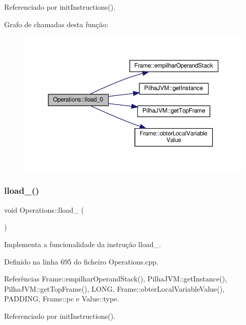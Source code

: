 Referenciado por init\+Instructions().

Grafo de chamadas desta função\+:\nopagebreak
\begin{figure}[H]
\begin{center}
\leavevmode
\includegraphics[width=350pt]{classOperations_a556b64c0764f7a654a30540eb355aab3_cgraph}
\end{center}
\end{figure}
\mbox{\label{classOperations_a34e91f6520ca574abce6b2b30ce91948}} 
\subsubsection{\texorpdfstring{lload\+\_()}{lload\_1()}}
{\footnotesize\ttfamily void Operations\+::lload\+\_ (\begin{DoxyParamCaption}{ }\end{DoxyParamCaption})\hspace{0.3cm}{\ttfamily [private]}}



Implementa a funcionalidade da instrução lload\+\_. 



Definido na linha 695 do ficheiro Operations.\+cpp.



Referências Frame\+::empilhar\+Operand\+Stack(), Pilha\+J\+V\+M\+::get\+Instance(), Pilha\+J\+V\+M\+::get\+Top\+Frame(), L\+O\+NG, Frame\+::obter\+Local\+Variable\+Value(), P\+A\+D\+D\+I\+NG, Frame\+::pc e Value\+::type.



Referenciado por init\+Instructions().

